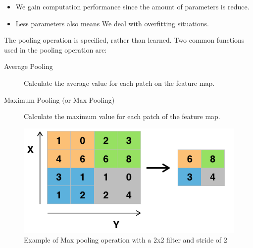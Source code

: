 \documentclass{report}
\begin{document}
\begin{itemize}
\item We gain computation performance since the amount of parameters is reduce.
\item Less parameters also means We deal with overfitting situations.
\end{itemize}

The pooling operation is specified, rather than learned. Two common functions used in the pooling operation are:
\begin{description}
\item[ Average Pooling ] Calculate the average value for each patch on the feature map.
\item[ Maximum Pooling (or Max Pooling) ] Calculate the maximum value for each patch of the feature map.
\end{description}

\begin{figure}[h]
  \centering
  \includegraphics[scale=0.35]{max_pooling}
  \caption{Example of Max pooling operation with a 2x2 filter  and stride of 2}
  \label{fig:pooling_eg}
\end{figure}
\end{document}
